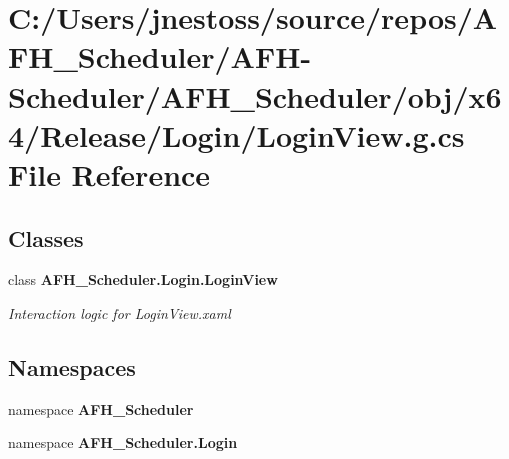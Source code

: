 \section{C\+:/\+Users/jnestoss/source/repos/\+A\+F\+H\+\_\+\+Scheduler/\+A\+F\+H-\/\+Scheduler/\+A\+F\+H\+\_\+\+Scheduler/obj/x64/\+Release/\+Login/\+Login\+View.g.\+cs File Reference}
\label{x64_2_release_2_login_2_login_view_8g_8cs}
\subsection*{Classes}
\begin{DoxyCompactItemize}
\item 
class \textbf{ A\+F\+H\+\_\+\+Scheduler.\+Login.\+Login\+View}
\begin{DoxyCompactList}\small\item\em Interaction logic for Login\+View.\+xaml \end{DoxyCompactList}\end{DoxyCompactItemize}
\subsection*{Namespaces}
\begin{DoxyCompactItemize}
\item 
namespace \textbf{ A\+F\+H\+\_\+\+Scheduler}
\item 
namespace \textbf{ A\+F\+H\+\_\+\+Scheduler.\+Login}
\end{DoxyCompactItemize}
